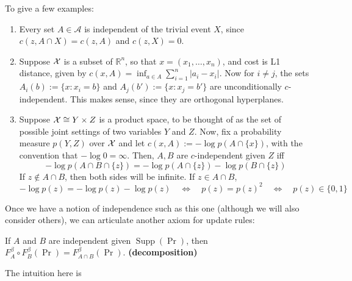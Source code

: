 \documentclass{article}
\DeclareMathOperator{\supp}{\mathrm{Supp}}
\begin{document}
To give a few examples:
\begin{enumerate}
    \item Every set $A \in\mathcal A$ is independent of the trivial event $X$, since
        $
            c(z, A\cap X) = c(z, A)
        $
        and $c(z, X) = 0$.
    \item Suppose $\mathcal X$ is a subset of $\mathbb R^n$, so that $x = (x_1, \ldots, x_n)$, and cost is L1 distance, given by $c(x,A) = \inf_{a \in A} \sum_{i=1}^n {|a_i - x_i|}$. Now for $i\ne j$,
    the sets $A_i(b) := \{ x : x_i = b \}$
    and $A_j(b') := \{x : x_j = b' \}$ are unconditionally $c$-independent.
    This makes sense, since they are orthogonal hyperplanes.

    \item  Suppose $\mathcal X \cong Y \times Z$ is a product space, to be thought of as the set of possible joint settings of two variables $Y$ and $Z$.
    Now, fix a probability measure $p(Y,Z)$ over $\mathcal X$
    and let
    $c(x, A) := -\log p(A \cap \{x\})$, with the convention that $-\log 0 = \infty$.
    Then, $A, B$ are $c$-independent given $Z$ iff
    \[
        - \log p(A \cap B \cap \{z\}) =
        - \log p(A \cap \{z\}) - \log p(B \cap \{z\})
    \]
    If $z \notin A \cap B$, then both sides will be infinite. If $z \in A \cap B$,
    \[
        - \log p(z) = - \log p(z) - \log p(z)
        \quad\iff\quad
        p(z) = p(z)^2
        \quad\iff\quad
        p(z) \in \{0,1\}
    \]
\end{enumerate}

Once we have a notion of independence such as this one (although we will also consider others), we can articulate another axiom for update rules:
\begin{URaxioms}
    \item
    If $A$ and $B$ are independent given $\supp(\Pr)$, then \\
    $F^{\beta}_A \circ F^{\beta}_B (\Pr) = F^{\beta}_{A \cap B}(\Pr)$.
        \hfill \textbf{(decomposition)}
\end{URaxioms}
The intuition here is
\end{document}
